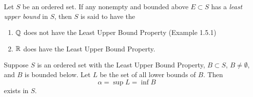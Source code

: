 \documentclass{article}
\begin{document}
\begin{definition}
    Let $S$ be an ordered set. If any nonempty and bounded above $E\subset S$ has a \emph{least upper bound} in $S$, then $S$ is said to have the 
\end{definition}
\begin{example}
    \listhack
    \begin{enumerate}
        \item $\mathbb Q$ does not have the Least Upper Bound Property (Example 1.5.1)
        \item $\mathbb R$ does have the Least Upper Bound Property.
    \end{enumerate}
\end{example}   

\begin{theorem}
        Suppose $S$ is an ordered set with the Least Upper Bound Property, $B\subset S$, $B\neq\emptyset$, and $B$ is bounded below. Let $L$ be the set of all lower bounds of $B$. Then \[\alpha=\sup{L}=\inf{B}\]exists in $S$.
\end{theorem}
\end{document}
